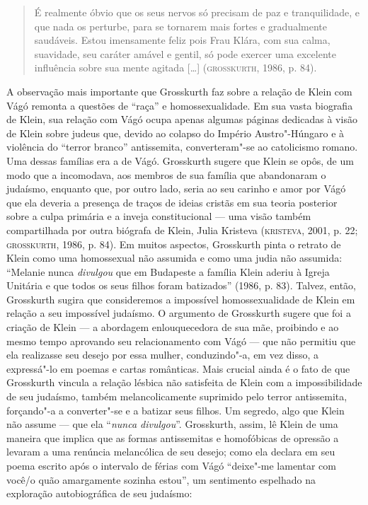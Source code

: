 \begin{quote}
É realmente óbvio que os seus nervos só precisam de paz e
tranquilidade, e que nada os perturbe, para se tornarem mais fortes e
gradualmente saudáveis. Estou imensamente feliz pois Frau Klára, com sua
calma, suavidade, seu caráter amável e gentil, só pode exercer uma
excelente influência sobre sua mente agitada {[}\ldots{}{]} (\textsc{grosskurth},
1986, p. 84).
\end{quote}

A observação mais importante que Grosskurth faz sobre a relação de Klein
com Vágó remonta a questões de ``raça'' e homossexualidade. Em sua vasta
biografia de Klein, sua relação com Vágó ocupa apenas algumas páginas
dedicadas à visão de Klein sobre judeus que, devido ao colapso do
Império Austro"-Húngaro e à violência do ``terror branco'' antissemita,
converteram"-se ao catolicismo romano. Uma dessas famílias era a de Vágó.
Grosskurth sugere que Klein se opôs, de um modo que a incomodava, aos
membros de sua família que abandonaram o judaísmo, enquanto que, por
outro lado, seria ao seu carinho e amor por Vágó que ela deveria a
presença de traços de ideias cristãs em sua teoria posterior sobre a
culpa primária e a inveja constitucional --- uma visão também
compartilhada por outra biógrafa de Klein, Julia Kristeva (\textsc{kristeva},
2001, p. 22; \textsc{grosskurth}, 1986, p. 84). Em muitos aspectos, Grosskurth pinta o
retrato de Klein como uma homossexual não assumida e como uma judia não
assumida: ``Melanie nunca \emph{divulgou} que em Budapeste a família
Klein aderiu à Igreja Unitária e que todos os seus filhos foram
batizados'' (1986, p. 83). Talvez, então, Grosskurth sugira que
consideremos a impossível homossexualidade de Klein em relação a seu
impossível judaísmo. O argumento de Grosskurth sugere que foi a criação
de Klein --- a abordagem enlouquecedora de sua mãe, proibindo e ao mesmo
tempo aprovando seu relacionamento com Vágó --- que não permitiu que ela
realizasse seu desejo por essa mulher, conduzindo"-a, em vez disso, a
expressá"-lo em poemas e cartas românticas. Mais crucial ainda é o fato
de que Grosskurth vincula a relação lésbica não satisfeita de Klein com
a impossibilidade de seu judaísmo, também melancolicamente suprimido
pelo terror antissemita, forçando"-a a converter"-se e a batizar seus
filhos. Um segredo, algo que Klein não assume --- que ela ``\emph{nunca
divulgou}''. Grosskurth, assim, lê Klein de uma maneira que implica que
as formas antissemitas e homofóbicas de opressão a levaram a uma
renúncia melancólica de seu desejo; como ela declara em seu poema
escrito após o intervalo de férias com Vágó ``deixe"-me lamentar com
você/o quão amargamente sozinha estou'', um sentimento espelhado na
exploração autobiográfica de seu judaísmo:

